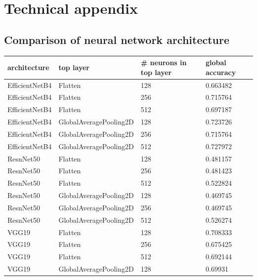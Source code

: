 \appendix
\section{Technical appendix}
\label{sec:appendix}

\subsection{Comparison of neural network architecture}
\label{sec:appendixA}

\begin{table}[H]
    \centering
\begin{tabular}{llll}
    \toprule
    architecture & top layer & \# neurons in top layer &       global accuracy \\
    \midrule
    EfficientNetB4 &   Flatten &                    128 &  0.663482 \\
    EfficientNetB4 &   Flatten &                    256 &  0.715764 \\
    EfficientNetB4 &   Flatten &                    512 &  0.697187 \\
    EfficientNetB4 &   GlobalAveragePooling2D &                    128 &  0.723726 \\
    EfficientNetB4 &   GlobalAveragePooling2D &                    256 &  0.715764 \\
    EfficientNetB4 &   GlobalAveragePooling2D &                    512 &  0.727972 \\
        ResnNet50 &   Flatten &                    128 &  0.481157 \\
        ResnNet50 &   Flatten &                    256 &  0.481423 \\
        ResnNet50 &   Flatten &                    512 &  0.522824 \\
        ResnNet50 &   GlobalAveragePooling2D &                    128 &  0.469745 \\
        ResnNet50 &   GlobalAveragePooling2D &                    256 &  0.469745 \\
        ResnNet50 &   GlobalAveragePooling2D &                    512 &  0.526274 \\
           VGG19 &   Flatten &                    128 &  0.708333 \\
           VGG19 &   Flatten &                    256 &  0.675425 \\
           VGG19 &   Flatten &                    512 &  0.692144 \\
           VGG19 &   GlobalAveragePooling2D &                    128 &   0.69931 \\

\end{tabular}
\end{table}
